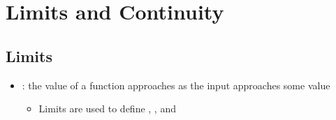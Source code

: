 \chapter{Limits and Continuity}

\section{Limits}


\smallskip

\begin{itemize}
  \item {}: the value of a function  approaches as the input  approaches some value   
  \begin{itemize}
    \item Limits are used to define \hyperref[s: Continuity]{}, \hyperref[c: Derivatives]{}, and \hyperref[c: Integrals]{}
  \end{itemize}


\end{itemize}

